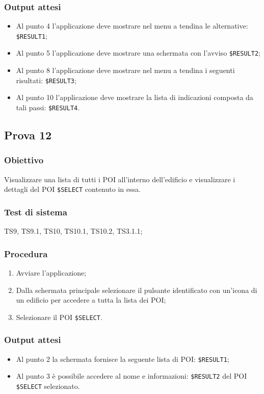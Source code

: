 \documentclass[../Sperimentazione.tex]{subfiles}
\begin{document}
	\subsubsection{Output attesi}
		\begin{itemize}
		\item Al punto 4 l'applicazione deve mostrare nel menu a tendina le alternative:  \verb|$RESULT1|;
		\item Al punto 5 l'applicazione deve mostrare una schermata con l'avviso \verb|$RESULT2|;
		\item Al punto 8 l'applicazione deve mostrare nel menu a tendina i seguenti risultati:  \verb|$RESULT3|;
		\item Al punto 10 l'applicazione deve mostrare la lista di indicazioni composta da tali passi:  \verb|$RESULT4|.
		\end{itemize}

	


\newpage	
\subsection{Prova 12} %
\label{subsec:Prova12}
	
	\subsubsection{Obiettivo}
		Visualizzare una lista di tutti i POI all'interno dell'edificio e visualizzare i dettagli del POI \verb|$SELECT| contenuto in essa.
		
	\subsubsection{Test di sistema}
		TS9, TS9.1,
		TS10, TS10.1, TS10.2,
		TS3.1.1;

	\subsubsection{Procedura}
		\begin{enumerate}
		\item Avviare l'applicazione;
		\item Dalla schermata principale selezionare il pulsante identificato con un'icona di un edificio per accedere a tutta la lista dei POI;
		\item Selezionare il POI \verb|$SELECT|.
		\end{enumerate}
		
	\subsubsection{Output attesi}
		\begin{itemize}
		\item Al punto 2 la schermata fornisce la seguente lista di POI:  \verb|$RESULT1|;
		\item Al punto 3 è possibile accedere al nome e informazioni:  \verb|$RESULT2| del POI  \verb|$SELECT| selezionato.
		\end{itemize}
	
\end{document}
